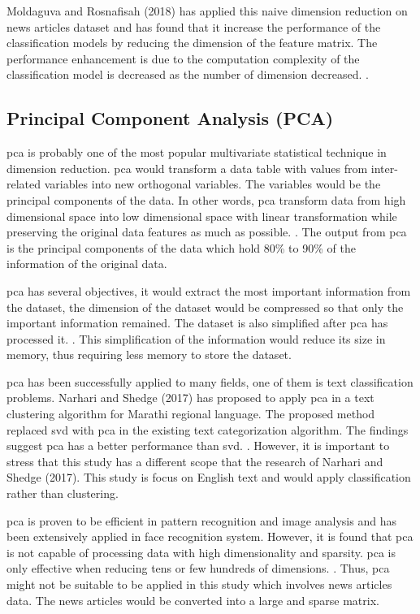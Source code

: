 Moldaguva and Rosnafisah (2018) has applied this naive dimension reduction on news articles dataset and has found that it increase the performance of the classification models by reducing the dimension of the feature matrix. The performance enhancement is due to the computation complexity of the classification model is decreased as the number of dimension decreased. \cite{knnVectorSpaceReduction}.\\


\subsection{Principal Component Analysis (PCA)}
\Ac{pca} is probably one of the most popular multivariate statistical technique in dimension reduction. \Ac{pca} would transform a data table with values from inter-related variables into new orthogonal variables. The variables would be the principal components of the data. In other words, \ac{pca} transform data from high dimensional space into low dimensional space with linear transformation while preserving the original data features as much as possible. \cite{pcaImage}. The output from \ac{pca} is the principal components of the data which hold 80\% to 90\% of the information of the original data.

\Ac{pca} has several objectives, it would extract the most important information from the dataset, the dimension of the dataset would be compressed so that only the important information remained. The dataset is also simplified after \ac{pca} has processed it. \cite{pcaObj}. This simplification of the information would reduce its size in memory, thus requiring less memory to store the dataset.

\Ac{pca} has been successfully applied to many fields, one of them is text classification problems. Narhari and Shedge (2017) has proposed to apply \ac{pca} in a text clustering algorithm for Marathi regional language. The proposed method replaced \ac{svd} with \ac{pca} in the existing text categorization algorithm. The findings suggest \ac{pca} has a better performance than \ac{svd}. \cite{marathi}. However, it is important to stress that this study has a different scope that the research of Narhari and Shedge (2017). This study is focus on English text and would apply classification rather than clustering.

\Ac{pca} is proven to be efficient in pattern recognition and image analysis and has been extensively applied in face recognition system. However, it is found that \ac{pca} is not capable of processing data with high dimensionality and sparsity. \ac{pca} is only effective when reducing tens or few hundreds of dimensions. \cite{dimRedCat}. Thus, \ac{pca} might not be suitable to be applied in this study which involves news articles data. The news articles would be converted into a large and sparse matrix.\\

